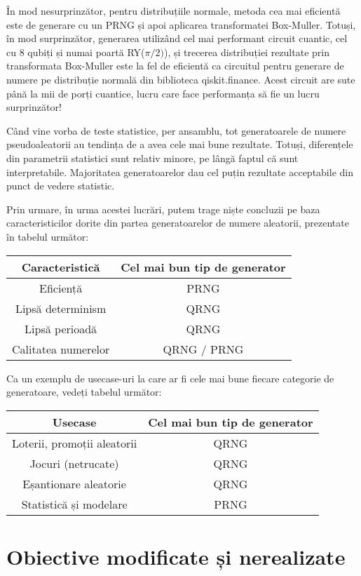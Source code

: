 În mod nesurprinzător, pentru distribuțiile normale, metoda cea mai eficientă este de generare cu un PRNG și apoi aplicarea transformatei Box-Muller. Totuși, în mod surprinzător, generarea utilizând cel mai performant circuit cuantic, cel cu 8 qubiți și numai poartă RY($\pi/2)$), și trecerea distribuției rezultate prin transformata Box-Muller este la fel de eficientă ca circuitul pentru generare de numere pe distribuție normală din biblioteca qiskit.finance. Acest circuit are sute până la mii de porți cuantice, lucru care face performanța să fie un lucru surprinzător!

Când vine vorba de teste statistice, per ansamblu, tot generatoarele de numere pseudoaleatorii au tendința de a avea cele mai bune rezultate. Totuși, diferențele din parametrii statistici sunt relativ minore, pe lângă faptul că sunt interpretabile. Majoritatea generatoarelor dau cel puțin rezultate acceptabile din punct de vedere statistic.

Prin urmare, în urma acestei lucrări, putem trage niște concluzii pe baza caracteristicilor dorite din partea generatoarelor de numere aleatorii, prezentate în tabelul următor:

\begin{tabular}{|c|c|}
     \hline
     Caracteristică & Cel mai bun tip de generator  \\
     \hline
     Eficiență & PRNG \\
     Lipsă determinism & QRNG \\
     Lipsă perioadă & QRNG \\
     Calitatea numerelor & QRNG / PRNG \\
     \hline
\end{tabular}

Ca un exemplu de usecase-uri la care ar fi cele mai bune fiecare categorie de generatoare, vedeți tabelul următor:

\begin{tabular}{|c|c|}
    \hline
     Usecase & Cel mai bun tip de generator \\
     \hline
     Loterii, promoții aleatorii & QRNG \\
     Jocuri (netrucate) & QRNG \\
     Eșantionare aleatorie & QRNG \\
     Statistică și modelare & PRNG \\
    \hline
\end{tabular}

\section*{Obiective modificate și nerealizate}

